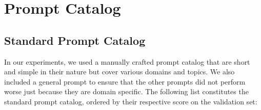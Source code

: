 \documentclass{article}
\theoremstyle{plain}
\theoremstyle{definition}
\theoremstyle{remark}
\begin{document}





\appendix
\section{Prompt Catalog}
\subsection{Standard Prompt Catalog}
\label{basic_prompt_catalog}
In our experiments, we used a manually crafted prompt catalog that are short and simple in their nature but cover various domains and topics. We also included a general prompt to ensure that the other prompts did not perform worse just because they are domain specific. The following list constitutes the standard prompt catalog, ordered by their respective score on the validation set:
\end{document}
